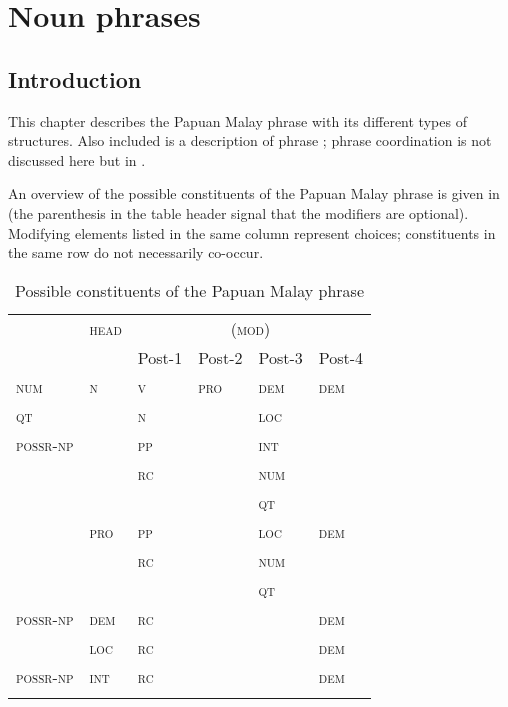 \chapter[Noun phrases]{Noun phrases}
\label{Para_8}
\section{Introduction}
\label{Para_8.1}
This chapter describes the Papuan Malay  phrase with its different types of structures. Also included is a description of  phrase ;  phrase coordination is not discussed here but in .

An overview of the possible constituents of the Papuan Malay  phrase is given in 
 (the parenthesis in the table header signal that the modifiers are optional). Modifying elements listed in the same column represent choices; constituents in the same row do not necessarily co-occur.


\begin{table}
\caption{Possible constituents of the Papuan Malay  phrase}\label{Table_8.1}

\begin{tabular}{llllll}
\lsptoprule
\multicolumn{1}{c}{(\textsc{mod})} & \multicolumn{1}{c}{\textsc{head}} & \multicolumn{4}{c}{ (\textsc{mod})}\\
&  & \multicolumn{1}{c}{Post-1} & \multicolumn{1}{c}{Post-2} & \multicolumn{1}{c}{Post-3} & \multicolumn{1}{c}{ Post-4}\\
\midrule
\textsc{num} & \textsc{n} & \textsc{v} & \textsc{pro} & \textsc{dem} & \textsc{dem}\\
\textsc{qt} &  & \textsc{n} &  & \textsc{loc} & \\
\textsc{possr-np} &  & \textsc{pp} &  & \textsc{int} & \\
&  & \textsc{rc} &  & \textsc{num} & \\
&  &  &  & \textsc{qt} & \\
& \textsc{pro} & \textsc{pp} &  & \textsc{loc} & \textsc{dem}\\
&  & \textsc{rc} &  & \textsc{num} & \\
&  &  &  & \textsc{qt} & \\
\textsc{possr-np} & \textsc{dem} & \textsc{rc} &  &  & \textsc{dem}\\
& \textsc{loc} & \textsc{rc} &  &  & \textsc{dem}\\
\textsc{possr-np} & \textsc{int} & \textsc{rc} &  &  & \textsc{dem}\\
\lspbottomrule
\end{tabular}
\end{table}

